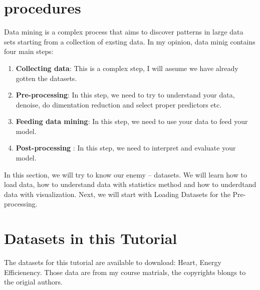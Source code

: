 \documentclass[letterpaper,11pt,english]{sphinxmanual}
\begin{document}

\section{procedures}
\label{dap:procedures}\label{dap:index-1}
Data mining is a complex process that aims to discover patterns in large data sets starting from a collection of exsting data. In my opinion, data minig contains four main steps:
\begin{enumerate}
\item {} 
\textbf{Collecting data}: This is a complex step, I will assume we have already gotten the datasets.

\item {} 
\textbf{Pre-processing}: In this step, we need to try to understand your data, denoise, do dimentation reduction and select proper predictors etc.

\item {} 
\textbf{Feeding data mining}: In this step, we need to use your data to feed your model.

\item {} 
\textbf{Post-processing} : In this step, we need to interpret and evaluate your model.

\end{enumerate}

In this section, we will try to know our enemy -- datasets. We will learn how to load data, how to understand data with statistics method and how to underdtand data with visualization. Next, we will start with Loading Datasets for the Pre-processing.


\section{Datasets in this Tutorial}
\label{dap:datasets-in-this-tutorial}\label{dap:index-2}
The datasets for this tutorial are available to download: Heart,  Energy Efficienency. Those data are from my course matrials, the copyrights blongs to the origial authors.

\end{document}
